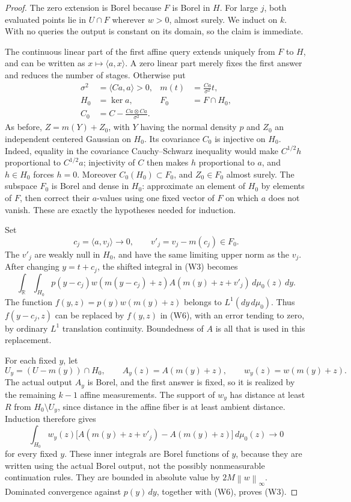 \documentclass[11pt,a4paper]{article}
\newcommand{\R}{\mathbb R}
\newcommand{\norm}[1]{\left\lVert#1\right\rVert}
\theoremstyle{definition}
\theoremstyle{remark}
\numberwithin{equation}{section}
\begin{document}
\begin{proof}
The zero extension is Borel because \(F\) is Borel in \(H\).
For large \(j\), both evaluated points lie in \(U\cap F\) wherever
\(w>0\), almost surely. We induct on \(k\). With no queries the output
is constant on its domain, so the claim is immediate.

The continuous linear part of the first affine query extends uniquely
from \(F\) to \(H\), and can be written as
\(x\mapsto\langle a,x\rangle\). A zero linear part merely fixes the
first answer and reduces the number of stages. Otherwise put
\[
\begin{aligned}
 \sigma^2&=\langle Ca,a\rangle>0,
 &m(t)&=\frac{Ca}{\sigma^2}t,\\
 H_0&=\ker a,
 &F_0&=F\cap H_0,\\
 C_0&=C-\frac{Ca\otimes Ca}{\sigma^2}.
\end{aligned}
 \tag{W4}
\]
As before, \(Z=m(Y)+Z_0\), with \(Y\) having the normal density \(p\)
and \(Z_0\) an independent centered Gaussian on \(H_0\).
Its covariance \(C_0\) is injective on \(H_0\). Indeed, equality in
the covariance Cauchy--Schwarz inequality would make
\(C^{1/2}h\) proportional to \(C^{1/2}a\); injectivity of \(C\)
then makes \(h\) proportional to \(a\), and \(h\in H_0\) forces
\(h=0\). Moreover \(C_0(H_0)\subset F_0\), and \(Z_0\in F_0\)
almost surely. The subspace \(F_0\) is Borel and dense in \(H_0\):
approximate an element of \(H_0\) by elements of \(F\), then correct
their \(a\)-values using one fixed vector of \(F\) on which \(a\)
does not vanish. These are exactly the hypotheses needed for
induction.

Set
\[
 c_j=\langle a,v_j\rangle\longrightarrow0,\qquad
 v'_j=v_j-m(c_j)\in F_0 .
 \tag{W5}
\]
The \(v'_j\) are weakly null in \(H_0\), and have the same limiting
upper norm as the \(v_j\). After changing \(y=t+c_j\), the shifted
integral in (W3) becomes
\[
 \int_\R\int_{H_0}p(y-c_j)w(m(y-c_j)+z)
       A(m(y)+z+v'_j)\,d\mu_0(z)\,dy .
 \tag{W6}
\]
The function \(f(y,z)=p(y)w(m(y)+z)\) belongs to
\(L^1(dy\,d\mu_0)\). Thus \(f(y-c_j,z)\) can be replaced by
\(f(y,z)\) in (W6), with an error tending to zero, by ordinary
\(L^1\) translation continuity. Boundedness of \(A\) is all that is
used in this replacement.

For each fixed \(y\), let
\[
 U_y=(U-m(y))\cap H_0,\qquad
 A_y(z)=A(m(y)+z),\qquad w_y(z)=w(m(y)+z).
 \tag{W7}
\]
The actual output \(A_y\) is Borel, and the first answer is fixed, so
it is realized by the remaining \(k-1\) affine measurements.
The support of \(w_y\) has distance at least \(R\) from
\(H_0\setminus U_y\), since distance in the affine fiber is at least
ambient distance. Induction therefore gives
\[
 \int_{H_0}w_y(z)\bigl[A(m(y)+z+v'_j)-A(m(y)+z)\bigr]\,d\mu_0(z)
                         \longrightarrow0
 \tag{W8}
\]
for every fixed \(y\). These inner integrals are Borel functions of
\(y\), because they are written using the actual Borel output,
not the possibly nonmeasurable continuation rules. They are bounded
in absolute value by \(2M\norm w_\infty\). Dominated convergence
against \(p(y)\,dy\), together with (W6), proves (W3).
\end{proof}
\end{document}
